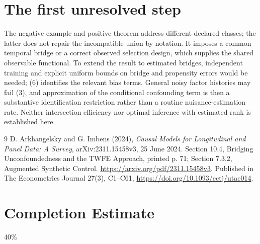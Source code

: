 \documentclass[11pt]{article}
\theoremstyle{remark}
\begin{document}
\section{The first unresolved step}
The negative example and positive theorem address different declared
classes; the latter does not repair the incompatible union by notation.
It imposes a common temporal bridge or a correct observed selection design,
which supplies the shared observable functional. To extend the result to
estimated bridges, independent training and explicit uniform bounds on
bridge and propensity errors would be needed; (6) identifies the relevant
bias terms. General noisy factor histories may fail (3), and approximation
of the conditional confounding term is then a substantive identification
restriction rather than a routine nuisance-estimation rate. Neither
intersection efficiency nor optimal inference with estimated rank is
established here.

\begin{thebibliography}{9}
 D. Arkhangelsky and G. Imbens (2024),
\emph{Causal Models for Longitudinal and Panel Data: A Survey},
arXiv:2311.15458v3, 25 June 2024. Section 10.4, Bridging
Unconfoundedness and the TWFE Approach, printed p. 71; Section 7.3.2,
Augmented Synthetic Control.
\url{https://arxiv.org/pdf/2311.15458v3}.
Published in The Econometrics Journal 27(3), C1--C61,
\url{https://doi.org/10.1093/ectj/utae014}.
\end{thebibliography}

\section{Completion Estimate}
40\%
\end{document}

